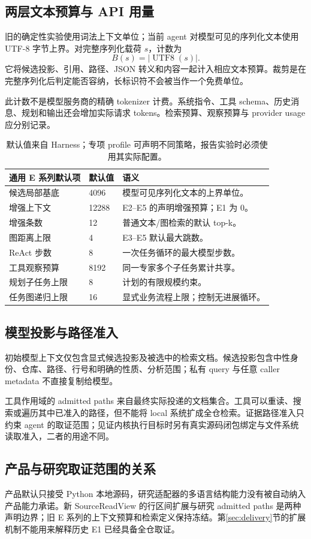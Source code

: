 \subsection{两层文本预算与 API 用量}
旧的确定性实验使用词法上下文单位；当前 agent 对模型可见的序列化文本使用 UTF-8 字节上界。对完整序列化载荷 $s$，计数为
\begin{equation}
B(s)=|\operatorname{UTF8}(s)|.
\end{equation}
它将候选投影、引用、路径、JSON 转义和内容一起计入相应文本预算。裁剪是在完整序列化后判定能否容纳，长标识符不会被当作一个免费单位。

此计数不是模型服务商的精确 tokenizer 计费。系统指令、工具 schema、历史消息、规划和输出还会增加实际请求 tokens。检索预算、观察预算与 provider usage 应分别记录。

\begin{table}[htbp]
\centering\small
\begin{tabularx}{\textwidth}{L{48mm}L{26mm}Y}
\toprule 通用 E 系列默认项 & 默认值 & 语义\\\midrule
候选局部基底 & 4096 & 模型可见序列化文本的上界单位。\\
增强上下文 & 12288 & E2--E5 的声明增强预算；E1 为 0。\\
增强条数 & 12 & 普通文本/图检索的默认 top-k。\\
图距离上限 & 4 & E3--E5 默认最大跳数。\\
ReAct 步数 & 8 & 一次任务循环的最大模型步数。\\
工具观察预算 & 8192 & 同一专家多个子任务累计共享。\\
规划子任务上限 & 8 & 计划的有限规模约束。\\
任务图递归上限 & 16 & 显式业务流程上限；控制无进展循环。\\
\bottomrule
\end{tabularx}
\caption{默认值来自 Harness；专项 profile 可声明不同策略，报告实验时必须使用其实际配置。}
\end{table}

\subsection{模型投影与路径准入}
初始模型上下文仅包含显式候选投影及被选中的检索文档。候选投影包含中性身份、仓库、路径、行号和明确的性质、分析范围；私有 query 与任意 caller metadata 不直接复制给模型。

工具作用域的 admitted paths 来自最终实际投递的文档集合。工具可以重读、搜索或遍历其中已准入的路径，但不能将 local 系统扩成全仓检索。证据路径准入只约束 agent 的取证范围；见证内核执行目标时另有真实源码闭包绑定与文件系统读取准入，二者的用途不同。


\subsection{产品与研究取证范围的关系}
产品默认只接受 Python 本地源码，研究适配器的多语言结构能力没有被自动纳入产品能力承诺。新 SourceReadView 的行区间扩展与研究 admitted paths 是两种声明边界；旧 E 系列的上下文预算和检索定义保持冻结。第\ref{sec:delivery}节的扩展机制不能用来解释历史 E1 已经具备全仓取证。
